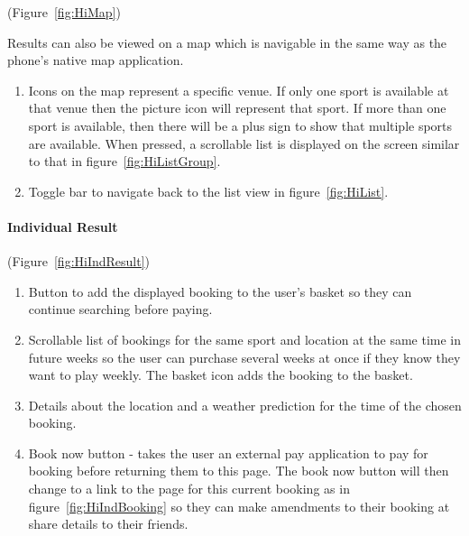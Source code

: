 (Figure~\ref{fig:HiMap})


Results can also be viewed on a map which is navigable in the same
way as the phone's native map application. 
\begin{enumerate}
	\item Icons on the map represent a specific venue. If only one sport is
	      available at that venue then the picture icon will represent that
	      sport. If more than one sport is available, then there will be a plus
	      sign to show that multiple sports are available. When pressed, a scrollable
	      list is displayed on the screen similar to that in figure~\ref{fig:HiListGroup}.
	\item Toggle bar to navigate back to the list view in figure~\ref{fig:HiList}.
\end{enumerate}

\paragraph{Individual Result}

(Figure~\ref{fig:HiIndResult})

\begin{enumerate}
	\item Button to add the displayed booking to the user's basket so they can
	      continue searching before paying.
	\item Scrollable list of bookings for the same sport and location at the
	      same time in future weeks so the user can purchase several weeks at
	      once if they know they want to play weekly. The basket icon adds the
	      booking to the basket.
	\item Details about the location and a weather prediction for the time of
	      the chosen booking.
	\item Book now button - takes the user an external pay application to pay
	      for booking before returning them to this page. The book now button
	      will then change to a link to the page for this current booking as
	      in figure~\ref{fig:HiIndBooking} so they can make amendments to their
	      booking at share details to their friends.\end{enumerate}
	      
	      
	      
